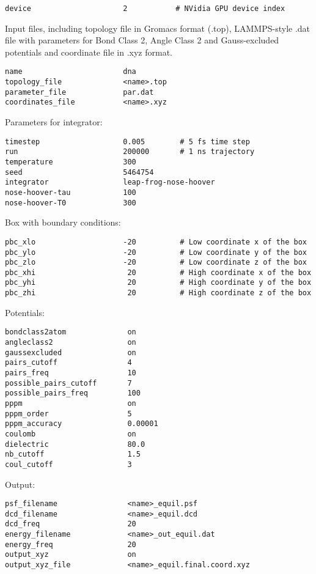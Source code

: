 \documentclass[12pt,a4paper]{article}
\begin{document}
\begin{verbatim}
device                     2           # NVidia GPU device index
\end{verbatim}
Input files, including topology file in Gromacs format (.top), LAMMPS-style .dat file with parameters for Bond Class 2, Angle Class 2 and Gauss-excluded potentials and coordinate file in .xyz format.
\begin{verbatim}
name                       dna 
topology_file              <name>.top 
parameter_file             par.dat 
coordinates_file           <name>.xyz  
\end{verbatim}
Parameters for integrator:
\begin{verbatim}
timestep                   0.005        # 5 fs time step
run                        200000       # 1 ns trajectory 
temperature                300 
seed                       5464754 
integrator                 leap-frog-nose-hoover 
nose-hoover-tau            100 
nose-hoover-T0             300 
\end{verbatim}
Box with boundary conditions:
\begin{verbatim}
pbc_xlo                    -20          # Low coordinate x of the box
pbc_ylo                    -20          # Low coordinate y of the box 
pbc_zlo                    -20          # Low coordinate z of the box 
pbc_xhi                     20          # High coordinate x of the box
pbc_yhi                     20          # High coordinate y of the box
pbc_zhi                     20          # High coordinate z of the box
\end{verbatim}
Potentials:
\begin{verbatim}
bondclass2atom              on  
angleclass2                 on 
gaussexcluded               on 
pairs_cutoff                4 
pairs_freq                  10 
possible_pairs_cutoff       7 
possible_pairs_freq         100 
pppm                        on 
pppm_order                  5 
pppm_accuracy               0.00001 
coulomb                     on 
dielectric                  80.0 
nb_cutoff                   1.5 
coul_cutoff                 3
\end{verbatim}
Output:
\begin{verbatim}
psf_filename                <name>_equil.psf 
dcd_filename                <name>_equil.dcd 
dcd_freq                    20 
energy_filename             <name>_out_equil.dat 
energy_freq                 20 
output_xyz					on
output_xyz_file             <name>_equil.final.coord.xyz  
\end{verbatim}
\end{document}
